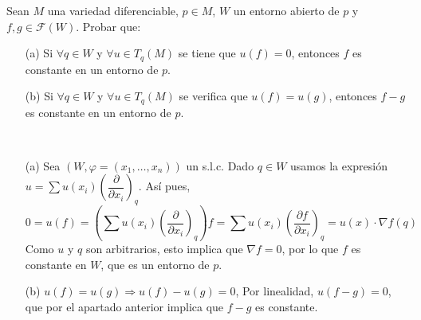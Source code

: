 \documentclass[twoside]{article}
\begin{document}
\begin{ejercicio}{2}
Sean $M$ una variedad diferenciable, $p \in M$, $W$ un entorno abierto de $p$ y
$f,g \in \mathcal{F}(W)$. Probar que:

\begin{itemize}
\item[(a)] Si $\forall q \in W$ y $\forall u \in  T_q(M)$ se tiene que $u(f) = 0$, entonces $f$ es constante
en un entorno de $p$.
\item[(b)] Si $\forall q \in W$ y $\forall u \in T_q(M)$ se verifica que $u(f) = u(g)$, entonces $f - g$ es
constante en un entorno de $p$.
\end{itemize}
\end{ejercicio}
\begin{solucion}\
\begin{itemize}
\item[(a)] Sea $(W,\varphi=(x_1,\dots,x_n))$ un s.l.c. Dado $q\in W$ usamos la expresión $u = \sum u(x_i) \left(\dfrac{\partial}{\partial x_i}\right)_q$. Así pues, 
\[
0=u(f) = \left(\sum u(x_i) \left(\dfrac{\partial}{\partial x_i}\right)_q\right)f=\sum u(x_i) \left(\frac{\partial f}{\partial x_i}\right)_q = u(x)\cdot\nabla f(q)
\]
Como $u$ y $q$ son arbitrarios, esto implica que $\nabla f=0$, por lo que $f$ es constante en $W$, que es un entorno de $p$. 
\item[(b)] $u(f) = u(g)\Rightarrow u(f)-u(g)=0$, Por linealidad, $u(f-g)=0$, que por el apartado anterior implica que $f-g$ es constante.
\end{itemize}
\end{solucion}

\newpage
\end{document}
